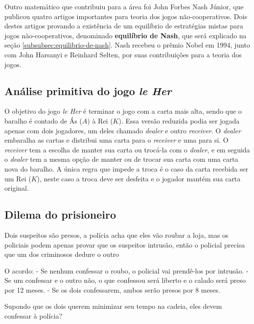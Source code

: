 Outro matemático que contribuiu para a área foi John Forbes Nash Júnior, que publicou quatro artigos importantes para teoria dos jogos não-cooperativos. Dois destes artigos \cite{nash_1950} \cite{nash_1951} provando a existência de um equilíbrio de estratégias mistas para jogos não-cooperativos, denominado \textbf{equilíbrio de Nash}, que será explicado na seção \ref{subsubsec:equilibrio-de-nash}. Nash recebeu o prêmio Nobel em 1994, junto com John Harsanyi e Reinhard Selten, por suas contribuições para a teoria dos jogos.

\subsection{Análise primitiva do jogo \emph{le Her}}
\label{subsec:analise-primitiva-do-jogo-le-her}

O objetivo do jogo \emph{le Her} é terminar o jogo com a carta mais alta, sendo que o baralho é contado de Ás ($A$) à Rei ($K$). Essa versão reduzida podia ser jogada apenas com dois jogadores, um deles chamado \emph{dealer} e outro \emph{receiver}. O \emph{dealer} embaralha as cartas e distribui uma carta para o \emph{receiver} e uma para si. O \emph{receiver} tem a escolha de manter sua carta ou trocá-la com o \emph{dealer}, e em seguida o \emph{dealer} tem a mesma opção de manter ou de trocar sua carta com uma carta nova do baralho. A única regra que impede a troca é o caso da carta recebida ser um Rei ($K$), neste caso a troca deve ser desfeita e o jogador mantém sua carta original.



\subsection{Dilema do prisioneiro}

Dois suspeitos são presos, a polícia acha que eles vão roubar a loja, mas os policiais podem apenas provar que os suspeitos intrusão, então o policial precisa que um dos criminosos dedure o outro

O acordo:
- Se nenhum confessar o roubo, o policial vai prendê-los por intrusão.
- Se um confessar e o outro não, o que confessou será liberto e o calado será preso por 12 meses.
- Se os dois confessarem, ambos serão presos por 8 meses.

Supondo que os dois querem minimizar seu tempo na cadeia, eles devem confessar à polícia?


